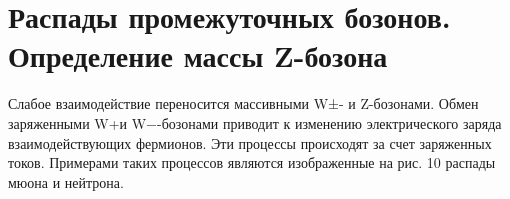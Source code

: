 \section{Распады промежуточных бозонов. Определение массы Z-бозона}

Слабое взаимодействие переносится массивными W±- и Z-бозонами. Обмен заряженными W+и W−-бозонами приводит к изменению электрического заряда взаимодействующих фермионов. Эти процессы происходят за счет заряженных токов. Примерами таких процессов являются изображенные на рис. 10 распады мюона и нейтрона.